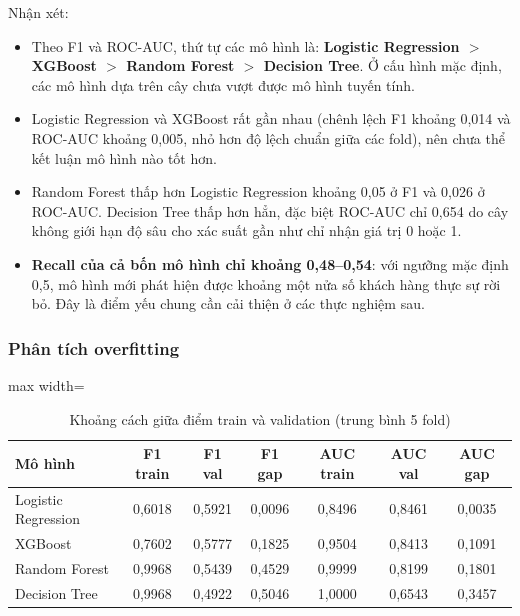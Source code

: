 Nhận xét:
\begin{itemize}
    \item Theo F1 và ROC-AUC, thứ tự các mô hình là: \textbf{Logistic Regression $>$ XGBoost $>$ Random Forest $>$ Decision Tree}. Ở cấu hình mặc định, các mô hình dựa trên cây chưa vượt được mô hình tuyến tính.
    \item Logistic Regression và XGBoost rất gần nhau (chênh lệch F1 khoảng 0,014 và ROC-AUC khoảng 0,005, nhỏ hơn độ lệch chuẩn giữa các fold), nên chưa thể kết luận mô hình nào tốt hơn.
    \item Random Forest thấp hơn Logistic Regression khoảng 0,05 ở F1 và 0,026 ở ROC-AUC. Decision Tree thấp hơn hẳn, đặc biệt ROC-AUC chỉ 0,654 do cây không giới hạn độ sâu cho xác suất gần như chỉ nhận giá trị 0 hoặc 1.
    \item \textbf{Recall của cả bốn mô hình chỉ khoảng 0,48--0,54}: với ngưỡng mặc định 0,5, mô hình mới phát hiện được khoảng một nửa số khách hàng thực sự rời bỏ. Đây là điểm yếu chung cần cải thiện ở các thực nghiệm sau.
\end{itemize}

\subsubsection{Phân tích overfitting}

\begin{table}[H]
\centering
\begin{adjustbox}{max width=\textwidth}
\begin{tabular}{|l|c|c|c|c|c|c|}
\hline
\textbf{Mô hình} & \textbf{F1 train} & \textbf{F1 val} & \textbf{F1 gap} & \textbf{AUC train} & \textbf{AUC val} & \textbf{AUC gap} \\
\hline
Logistic Regression & 0,6018 & 0,5921 & 0,0096 & 0,8496 & 0,8461 & 0,0035 \\
\hline
XGBoost             & 0,7602 & 0,5777 & 0,1825 & 0,9504 & 0,8413 & 0,1091 \\
\hline
Random Forest       & 0,9968 & 0,5439 & 0,4529 & 0,9999 & 0,8199 & 0,1801 \\
\hline
Decision Tree       & 0,9968 & 0,4922 & 0,5046 & 1,0000 & 0,6543 & 0,3457 \\
\hline
\end{tabular}
\end{adjustbox}
\caption{Khoảng cách giữa điểm train và validation (trung bình 5 fold)}
\end{table}


